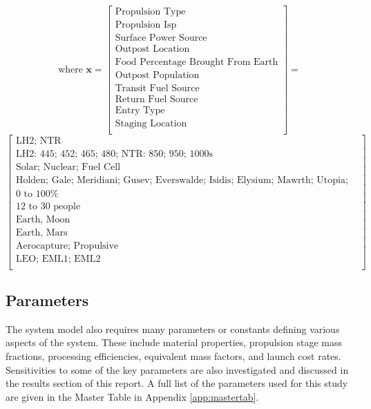 \documentclass[]{aiaa-pretty}
\begin{document}
\begin{equation*}
\mbox{where } \mathbf{x}
=
\begin{bmatrix}
\mbox{Propulsion Type}\\
\mbox{Propulsion Isp}\\
\mbox{Surface Power Source}\\
\mbox{Outpost Location}\\
\mbox{Food Percentage Brought From Earth}\\
\mbox{Outpost Population}\\
\mbox{Transit Fuel Source}\\
\mbox{Return Fuel Source}\\
\mbox{Entry Type}\\
\mbox{Staging Location}\\
\end{bmatrix}
=
\end{equation*}
\begin{equation*}
\begin{bmatrix}
\mbox{LH2; NTR}\\
\mbox{LH2: 445; 452; 465; 480; NTR: 850; 950; 1000s}\\
\mbox{Solar; Nuclear; Fuel Cell}\\
\mbox{Holden; Gale; Meridiani; Gusev; Everswalde; Isidis; Elysium; Mawrth; Utopia; Planus Boreum; Hellas; Amazonis}\\
\mbox{0 to 100\%}\\
\mbox{12 to 30 people}\\
\mbox{Earth, Moon}\\
\mbox{Earth, Mars}\\
\mbox{Aerocapture; Propulsive}\\
\mbox{LEO; EML1; EML2}\\
\end{bmatrix}
\end{equation*}

\subsection{Parameters}
\label{sec:params}
The system model also requires many parameters or constants defining various aspects of the system. These include material properties, propulsion stage mass fractions, processing efficiencies, equivalent mass factors, and launch cost rates. Sensitivities to some of the key parameters are also investigated and discussed in the results section of this report. A full list of the parameters used for this study are given in the Master Table in Appendix \ref{app:mastertab}. 
\end{document}
